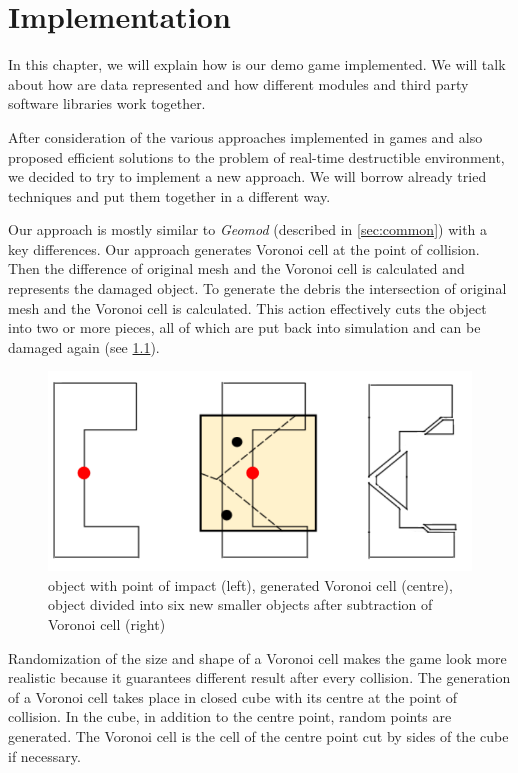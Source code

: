 \chapter{Implementation}
In this chapter, we will explain how is our demo game implemented. We will talk about how are data represented and how different modules and third party software libraries work together.

After consideration of the various approaches implemented in games and also proposed efficient solutions to the problem of real-time destructible environment, we decided to try to implement a new approach. We will borrow already tried techniques and put them together in a different way.

Our approach is mostly similar to \emph{Geomod} (described in \cref{sec:common}) with a key differences. Our approach generates Voronoi cell at the point of collision. Then the difference of original mesh and the Voronoi cell is calculated and represents the damaged object. To generate the debris the intersection of original mesh and the Voronoi cell is calculated. This action effectively cuts the object into two or more pieces, all of which are put back into simulation and can be damaged again (see \cref{fig:subtraction}).

\begin{figure}
        \centering
        \includegraphics[width=\textwidth]{img/subtractionProcess}
        \caption{object with point of impact (left), generated Voronoi cell (centre), object divided into six new smaller objects after subtraction of Voronoi cell (right)}
        \label{fig:subtraction}
\end{figure}

Randomization of the size and shape of a Voronoi cell makes the game look more realistic because it guarantees different result after every collision. The generation of a Voronoi cell takes place in closed cube with its centre at the point of collision. In the cube, in addition to the centre point, random points are generated. The Voronoi cell is the cell of the centre point cut by sides of the cube if necessary.

